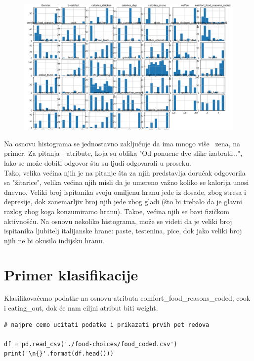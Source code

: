 \documentclass[12pt,a4paper]{article}
\begin{document}
\begin{figure}[H]
  \centering
  \includegraphics[width=15cm]{hist.png}
\end{figure}

Na osnovu histograma se jednostavno zaklju\v cuje da ima mnogo vi\v se \ zena, na primer. Za pitanja - atribute, koja su oblika "Od ponu\dj ene dve slike izabrati...", lako se mo\v ze dobiti odgovor \v sta su ljudi odgovarali u proseku. \\
Tako, velika ve\' cina njih je na pitanje \v sta za njih predstavlja doru\v cak odgovorila sa "\v zitarice", velika ve\' cina njih misli da je umereno va\v zno koliko se kalorija unosi dnevno. Veliki broj ispitanika svoju omiljenu hranu jede iz dosade, zbog stresa i depresije, dok zanemarljiv broj njih jede zbog gladi (\v sto bi trebalo da je glavni razlog zbog koga konzumiramo hranu). Tako\dj e, ve\' cina njih se bavi fizi\v ckom aktivno\v s\' cu. Na osnovu nekoliko histograma, mo\v ze se videti da je veliki broj ispitanika ljubitelj italijanske hrane: paste, testenina, pice, dok jako veliki broj njih ne bi okusilo indijsku hranu.

\newpage

\section{Primer klasifikacije}

Klasifikova\' cemo podatke na osnovu atributa comfort\_food\_reasons\_coded, cook i eating\_out, dok \' ce nam ciljni atribut biti weight.\\

\begin{lstlisting}[mathescape=true]
# najpre cemo ucitati podatke i prikazati prvih pet redova

df = pd.read_csv('./food-choices/food_coded.csv')
print('\n{}'.format(df.head()))
\end{lstlisting}
\end{document}
